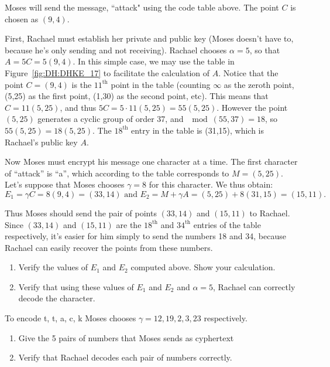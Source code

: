 \begin{example}{26} Moses will send the message, ``attack" using the code table above. The point $C$ is chosen as $(9,4)$. 

First, Rachael must establish her private and public key (Moses doesn't have to, because he's only sending and not receiving). Rachael chooses $\alpha= 5$, so that $A = 5C = 5(9,4)$. In this simple case, we  may use  the table in Figure~\ref{fig:DH:DHKE_17} to facilitate the calculation of $A$.  Notice that the point $C=(9,4)$ is the $11^{\textrm{th}}$ point in the table (counting $\infty$ as the zeroth point, (5,25) as the first point, (1,30) as the second point, etc). This means that $C = 11(5,25)$, and thus $5C = 5\cdot11(5,25) = 55(5,25)$.  However the point $(5,25)$ generates a cyclic group of order 37, and $\mod(55,37)=18$, so $55(5,25)=18(5,25)$.  The $18^{\textrm{th}}$ entry in the table is (31,15), which is Rachael's public key $A$.

Now Moses must encrypt his message one character at a time. The first character of ``attack'' is ``a'', which according to the table corresponds to $M=(5,25)$.  Let's suppose that Moses chooses $\gamma = 8$ for this character. We thus obtain:
\[
E_1=\gamma C = 8(9,4)=(33,14)  \text{   and   } 
E_2 = M +  \gamma A=(5,25) + 8(31,15) = (15,11). 
\]

Thus Moses should send the pair of points $(33,14)$ and $(15,11)$ to Rachael. Since $(33,14)$ and $(15,11)$ are the $18^{\textrm{th}}$ and $34^{\textrm{th}}$ entries of the table respectively, it's easier for him simply to send the numbers 18 and 34, because Rachael can easily recover the points from these numbers.

\begin{exercise}{}
\begin{enumerate}[a]
\item
Verify the values of $E_1$ and $E_2$ computed above. Show your calculation.
\item
Verify that using these values of $E_1$ and $E_2$ and $\alpha=5$, Rachael can correctly decode the character.
\end{enumerate}
\end{exercise}

\begin{exercise}{}
To encode t, t, a, c, k Moses chooses $\gamma = 12,19,2,3,23$ respectively. 
\begin{enumerate}[a]
\item Give the 5 pairs of numbers that Moses sends as cyphertext
\item Verify that Rachael decodes each pair of numbers correctly.
\end{enumerate}
\end{exercise}

\end{example}

